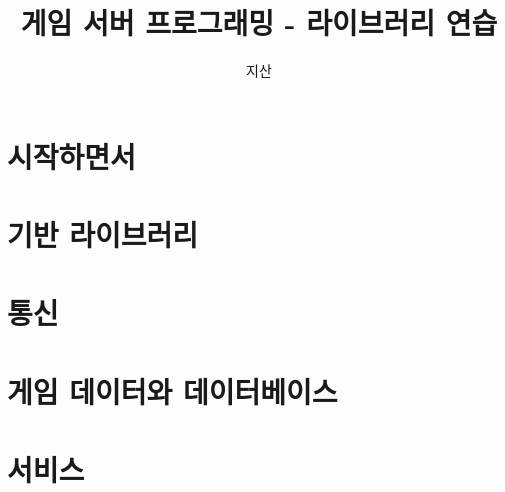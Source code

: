 \documentclass{book}
\begin{document}
\title{게임 서버 프로그래밍 - 라이브러리 연습}
\author{지산}
\maketitle
\tableofcontents

\part{시작하면서}



\part{기반 라이브러리}



\part{통신}


\part{게임 데이터와 데이터베이스}


\part{서비스}

\end{document}
